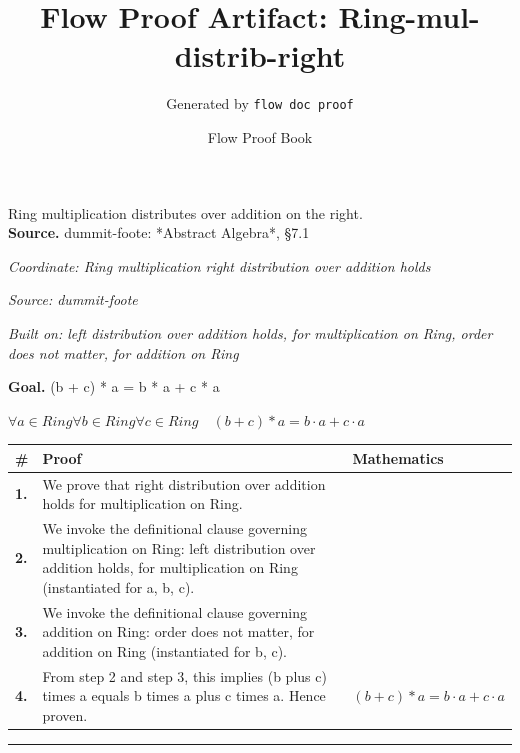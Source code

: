 \documentclass[11pt]{article}
\title{Flow Proof Artifact: Ring-mul-distrib-right}
\author{Generated by \texttt{flow doc proof}}
\date{Flow Proof Book}
\theoremstyle{definition}
\begin{document}
\maketitle
Ring multiplication distributes over addition on the right.\\[0.5em]
\textbf{Source.} dummit-foote: *Abstract Algebra*, §7.1\\[0.5em]
\bigskip
{}\par
\smallskip\noindent\textit{Coordinate: Ring \cdot multiplication \cdot right distribution over addition holds}\par
\smallskip\noindent\textit{Source: dummit-foote}\par
\smallskip\noindent\textit{Built on: left distribution over addition holds, for multiplication on Ring, order does not matter, for addition on Ring}\par
\medskip
\noindent\textbf{Goal.} (b + c) * a = b * a + c * a\par
\noindent$\displaystyle \forall a \in Ring \forall b \in Ring \forall c \in Ring\quad (b + c) * a = b \cdot a + c \cdot a$\par
\medskip
\noindent
\begin{tabular}{@{} >{\raggedright\arraybackslash}p{} >{\raggedright\arraybackslash}p{} >{\raggedleft\arraybackslash}p{} @{}}
\textbf{\#} & \textbf{Proof} & \textbf{Mathematics} \\
\midrule
\textbf{1.} & We prove that right distribution over addition holds for multiplication on Ring. & \\[0.45em]
\textbf{2.} & We invoke the definitional clause governing multiplication on Ring: left distribution over addition holds, for multiplication on Ring (instantiated for a, b, c). & \\[0.45em]
\textbf{3.} & We invoke the definitional clause governing addition on Ring: order does not matter, for addition on Ring (instantiated for b, c). & \\[0.45em]
\textbf{4.} & From step 2 and step 3, this implies (b plus c) times a equals b times a plus c times a. Hence proven. & $\displaystyle (b + c) * a = b \cdot a + c \cdot a$ \\[0.45em]
\bottomrule
\end{tabular}
\label{thm:Ring-multiplication-right_distribution_over_addition_holds}
\par\medskip\hrule
\end{document}
